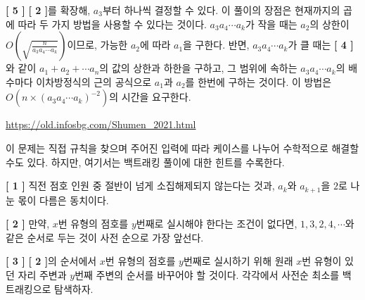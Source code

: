 \begin{hint}
    \textbf{[ 5 ]} \newline
    \textbf{[ 2 ]}를 확장해, $a_3$부터 하나씩 결정할 수 있다. 이 풀이의 장점은 현재까지의 곱에 따라 두 가지 방법을 사용할 수 있다는 것이다. $a_3 a_4 \cdots a_k$가 작을 때는 $a_2$의 상한이 $O \left( \sqrt{\frac{n}{a_3 a_4 \cdots a_k}} \right)$이므로, 가능한 $a_2$에 따라 $a_1$을 구한다. 반면, $a_3 a_4 \cdots a_k$가 클 때는 \textbf{[ 4 ]}와 같이 $a_1 + a_2 + \cdots a_n$의 값의 상한과 하한을 구하고, 그 범위에 속하는 $a_3 a_4 \cdots a_k$의 배수마다 이차방정식의 근의 공식으로 $a_1$과 $a_2$를 한번에 구하는 것이다. 이 방법은 $O(n \times (a_3 a_4 \cdots a_k)^{-2})$의 시간을 요구한다.
    
    \url{https://old.infosbg.com/Shumen_2021.html}
\end{hint}

\begin{hint}
    이 문제는 직접 규칙을 찾으며 주어진 입력에 따라 케이스를 나누어 수학적으로 해결할 수도 있다. 하지만, 여기서는 백트래킹 풀이에 대한 힌트를 수록한다.

    \textbf{[ 1 ]} \newline
    직전 점호 인원 중 절반이 넘게 소집해제되지 않는다는 것과, $a_k$와 $a_{k+1}$을 $2$로 나눈 몫이 다름은 동치이다.

    \textbf{[ 2 ]} \newline
    만약, $x$번 유형의 점호를 $y$번째로 실시해야 한다는 조건이 없다면, $1, 3, 2, 4, \cdots$와 같은 순서로 두는 것이 사전 순으로 가장 앞선다.

    \textbf{[ 3 ]} \newline
    \textbf{[ 2 ]}의 순서에서 $x$번 유형의 점호를 $y$번째로 실시하기 위해 원래 $x$번 유형이 있던 자리 주변과 $y$번째 주변의 순서를 바꾸어야 할 것이다. 각각에서 사전순 최소를 백트래킹으로 탐색하자.
\end{hint}